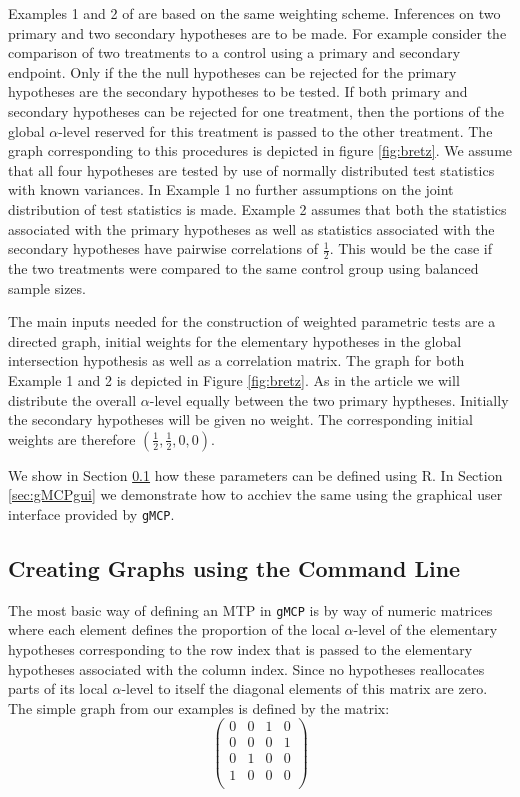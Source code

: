 \documentclass[a4paper, 11pt]{article}\usepackage[]{graphicx}\usepackage[]{color}
\newcommand{\al}{$\alpha$-level\xspace}
\newcommand{\gmcp}{\texttt{gMCP}\xspace}
\begin{document}
Examples 1 and 2 of \cite{Bretz11} are based on the same weighting
scheme. Inferences on two primary and two secondary hypotheses are to
be made. For example consider the comparison of two treatments to a
control using a primary and secondary endpoint. Only if the the null
hypotheses can be rejected for the primary hypotheses are the
secondary hypotheses to be tested. If both primary and secondary
hypotheses can be rejected for one treatment, then the portions of the
global \al reserved for this treatment is passed to the other
treatment. The graph corresponding to this procedures is depicted in
figure \ref{fig:bretz}. We assume that all four hypotheses are tested
by use of normally distributed test statistics with known
variances. In Example 1 no further assumptions on the joint
distribution of test statistics is made. Example 2 assumes that both
the statistics associated with the primary hypotheses as well as
statistics associated with the secondary hypotheses have pairwise
correlations of $\frac{1}{2}$. This would be the case if the two
treatments were compared to the same control group using balanced
sample sizes. 

The main inputs needed for the construction of weighted parametric
tests are a directed graph, initial weights for the elementary
hypotheses in the global intersection hypothesis as well as a
correlation matrix. The graph for both Example 1 and 2 is depicted in
Figure \ref{fig:bretz}. As in the article we will distribute the
overall \al equally between the two primary hyptheses. Initially the
secondary hypotheses will be given no weight. The corresponding
initial weights are therefore $(\frac{1}{2},\frac{1}{2},0,0)$. 

We show in Section \ref{sec:comline} how these parameters can be
defined using R. In Section \ref{sec:gMCPgui} we demonstrate how to
acchiev the same using the graphical user interface provided by \gmcp.

\subsection{Creating Graphs using the Command Line}
\label{sec:comline}

The most basic way of defining an MTP in \gmcp is by way of
numeric matrices where each element defines the proportion of
the local \al of the elementary hypotheses corresponding to the row
index that is passed to the elementary hypotheses associated with the
column index. Since no hypotheses reallocates parts of its local \al
to itself the diagonal elements of this matrix are zero. The simple
graph from our examples is defined by the matrix: 
\begin{displaymath}
  \left( \begin{array}{cccc}
      0 & 0 & 1 & 0 \\
      0 & 0 & 0 & 1 \\
      0 & 1 & 0 & 0 \\
      1 & 0 & 0 & 0 \\
    \end{array} \right)
\end{displaymath}
\end{document}
